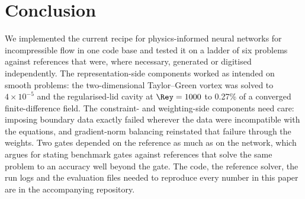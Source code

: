 \section{Conclusion}
\label{sec:conclusion}

We implemented the current recipe for physics-informed neural networks for incompressible flow in one code
base and tested it on a ladder of six problems against references that were, where necessary, generated or
digitised independently. The representation-side components worked as intended on smooth problems: the
two-dimensional Taylor--Green vortex was solved to $4\times10^{-5}$ and the regularised-lid cavity at
$\Rey=1000$ to 0.27\% of a converged finite-difference field. The constraint- and weighting-side components
need care: imposing boundary data exactly failed wherever the data were incompatible with the equations, and
gradient-norm balancing reinstated that failure through the weights. Two gates depended on the reference as
much as on the network, which argues for stating benchmark gates against references that solve the same
problem to an accuracy well beyond the gate.  The code, the reference solver, the run logs and the evaluation files needed to reproduce every
number in this paper are in the accompanying repository.
